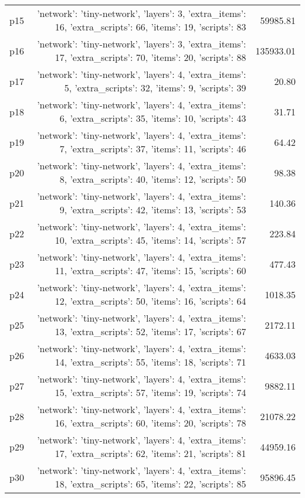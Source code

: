 \documentclass{article}
\begin{document}
\begin{center}
\begin{tabular}{@{}l|r|r@{}}
  p15&{'network': 'tiny-network', 'layers': 3, 'extra\_items': 16, 'extra\_scripts': 66, 'items': 19, 'scripts': 83}&59985.81\\
  p16&{'network': 'tiny-network', 'layers': 3, 'extra\_items': 17, 'extra\_scripts': 70, 'items': 20, 'scripts': 88}&135933.01\\
  p17&{'network': 'tiny-network', 'layers': 4, 'extra\_items': 5, 'extra\_scripts': 32, 'items': 9, 'scripts': 39}&20.80\\
  p18&{'network': 'tiny-network', 'layers': 4, 'extra\_items': 6, 'extra\_scripts': 35, 'items': 10, 'scripts': 43}&31.71\\
  p19&{'network': 'tiny-network', 'layers': 4, 'extra\_items': 7, 'extra\_scripts': 37, 'items': 11, 'scripts': 46}&64.42\\
  p20&{'network': 'tiny-network', 'layers': 4, 'extra\_items': 8, 'extra\_scripts': 40, 'items': 12, 'scripts': 50}&98.38\\
  p21&{'network': 'tiny-network', 'layers': 4, 'extra\_items': 9, 'extra\_scripts': 42, 'items': 13, 'scripts': 53}&140.36\\
  p22&{'network': 'tiny-network', 'layers': 4, 'extra\_items': 10, 'extra\_scripts': 45, 'items': 14, 'scripts': 57}&223.84\\
  p23&{'network': 'tiny-network', 'layers': 4, 'extra\_items': 11, 'extra\_scripts': 47, 'items': 15, 'scripts': 60}&477.43\\
  p24&{'network': 'tiny-network', 'layers': 4, 'extra\_items': 12, 'extra\_scripts': 50, 'items': 16, 'scripts': 64}&1018.35\\
  p25&{'network': 'tiny-network', 'layers': 4, 'extra\_items': 13, 'extra\_scripts': 52, 'items': 17, 'scripts': 67}&2172.11\\
  p26&{'network': 'tiny-network', 'layers': 4, 'extra\_items': 14, 'extra\_scripts': 55, 'items': 18, 'scripts': 71}&4633.03\\
  p27&{'network': 'tiny-network', 'layers': 4, 'extra\_items': 15, 'extra\_scripts': 57, 'items': 19, 'scripts': 74}&9882.11\\
  p28&{'network': 'tiny-network', 'layers': 4, 'extra\_items': 16, 'extra\_scripts': 60, 'items': 20, 'scripts': 78}&21078.22\\
  p29&{'network': 'tiny-network', 'layers': 4, 'extra\_items': 17, 'extra\_scripts': 62, 'items': 21, 'scripts': 81}&44959.16\\
  p30&{'network': 'tiny-network', 'layers': 4, 'extra\_items': 18, 'extra\_scripts': 65, 'items': 22, 'scripts': 85}&95896.45
                            \end{tabular}
                            \end{center}
                    
\end{document}
